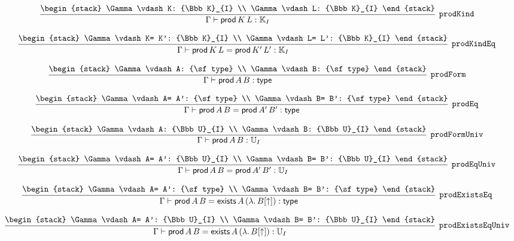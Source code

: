 \[
\infer[{\tt prodKind}]{\Gamma \vdash {\sf prod}\,K\,L: {\Bbb K}_{I}}{
\begin{stack}
\Gamma \vdash K: {\Bbb K}_{I}
\\
\Gamma \vdash L: {\Bbb K}_{I}
\end{stack}}
\]

\[
\infer[{\tt prodKindEq}]{\Gamma \vdash {\sf prod}\,K\,L= {\sf prod}\,K'\,L': {\Bbb K}_{I}}{
\begin{stack}
\Gamma \vdash K= K': {\Bbb K}_{I}
\\
\Gamma \vdash L= L': {\Bbb K}_{I}
\end{stack}}
\]

\[
\infer[{\tt prodForm}]{\Gamma \vdash {\sf prod}\,A\,B: {\sf type}}{
\begin{stack}
\Gamma \vdash A: {\sf type}
\\
\Gamma \vdash B: {\sf type}
\end{stack}}
\]

\[
\infer[{\tt prodEq}]{\Gamma \vdash {\sf prod}\,A\,B= {\sf prod}\,A'\,B': {\sf type}}{
\begin{stack}
\Gamma \vdash A= A': {\sf type}
\\
\Gamma \vdash B= B': {\sf type}
\end{stack}}
\]

\[
\infer[{\tt prodFormUniv}]{\Gamma \vdash {\sf prod}\,A\,B: {\Bbb U}_{I}}{
\begin{stack}
\Gamma \vdash A: {\Bbb U}_{I}
\\
\Gamma \vdash B: {\Bbb U}_{I}
\end{stack}}
\]

\[
\infer[{\tt prodEqUniv}]{\Gamma \vdash {\sf prod}\,A\,B= {\sf prod}\,A'\,B': {\Bbb U}_{I}}{
\begin{stack}
\Gamma \vdash A= A': {\Bbb U}_{I}
\\
\Gamma \vdash B= B': {\Bbb U}_{I}
\end{stack}}
\]

\[
\infer[{\tt prodExistsEq}]{\Gamma \vdash {\sf prod}\,A\,B= {\sf exists}\,A\,(\lambda .\,B[\uparrow ]): {\sf type}}{
\begin{stack}
\Gamma \vdash A= A': {\sf type}
\\
\Gamma \vdash B= B': {\sf type}
\end{stack}}
\]

\[
\infer[{\tt prodExistsEqUniv}]{\Gamma \vdash {\sf prod}\,A\,B= {\sf exists}\,A\,(\lambda .\,B[\uparrow ]): {\Bbb U}_{I}}{
\begin{stack}
\Gamma \vdash A= A': {\Bbb U}_{I}
\\
\Gamma \vdash B= B': {\Bbb U}_{I}
\end{stack}}
\]

